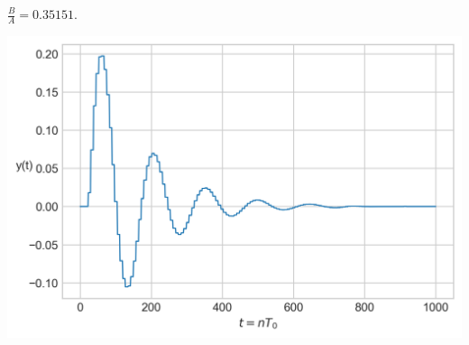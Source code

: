 $\frac{B}{A} = 0.35151$.
\begin{center}
    \includegraphics[scale=0.75]{pics/transient_process_task_5_2.png}
\end{center}